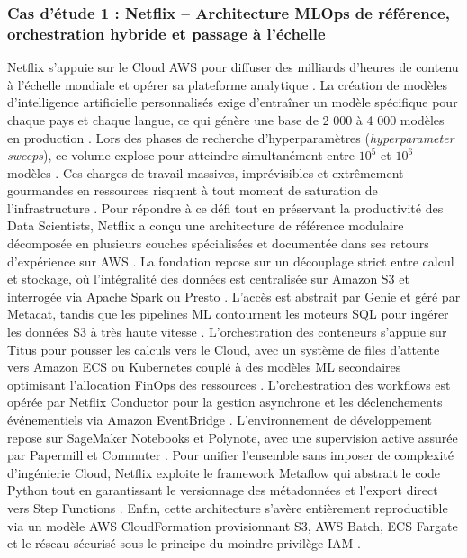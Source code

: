 \subsubsection{Cas d'étude 1 : Netflix -- Architecture MLOps de référence, orchestration hybride et passage à l'échelle}
Netflix s'appuie sur le Cloud AWS pour diffuser des milliards d'heures de contenu à l'échelle mondiale et opérer sa plateforme analytique \cite{86}. La création de modèles d'intelligence artificielle personnalisés exige d'entraîner un modèle spécifique pour chaque pays et chaque langue, ce qui génère une base de 2 000 à 4 000 modèles en production \cite{76}. Lors des phases de recherche d'hyperparamètres (\textit{hyperparameter sweeps}), ce volume explose pour atteindre simultanément entre $10^5$ et $10^6$ modèles \cite{76}. Ces charges de travail massives, imprévisibles et extrêmement gourmandes en ressources risquent à tout moment de saturation de l'infrastructure \cite{76}. Pour répondre à ce défi tout en préservant la productivité des Data Scientists, Netflix a conçu une architecture de référence modulaire décomposée en plusieurs couches spécialisées et documentée dans ses retours d'expérience sur AWS \cite{76}. La fondation repose sur un découplage strict entre calcul et stockage, où l'intégralité des données est centralisée sur Amazon S3 et interrogée via Apache Spark ou Presto \cite{76}. L'accès est abstrait par Genie et géré par Metacat, tandis que les pipelines ML contournent les moteurs SQL pour ingérer les données S3 à très haute vitesse \cite{76}. L'orchestration des conteneurs s'appuie sur Titus pour pousser les calculs vers le Cloud, avec un système de files d'attente vers Amazon ECS ou Kubernetes couplé à des modèles ML secondaires optimisant l'allocation FinOps des ressources \cite{76}. L'orchestration des workflows est opérée par Netflix Conductor pour la gestion asynchrone et les déclenchements événementiels via Amazon EventBridge \cite{76}. L'environnement de développement repose sur SageMaker Notebooks et Polynote, avec une supervision active assurée par Papermill et Commuter \cite{76}. Pour unifier l'ensemble sans imposer de complexité d'ingénierie Cloud, Netflix exploite le framework Metaflow qui abstrait le code Python tout en garantissant le versionnage des métadonnées et l'export direct vers Step Functions \cite{76}. Enfin, cette architecture s'avère entièrement reproductible via un modèle AWS CloudFormation provisionnant S3, AWS Batch, ECS Fargate et le réseau sécurisé sous le principe du moindre privilège IAM \cite{76}.

